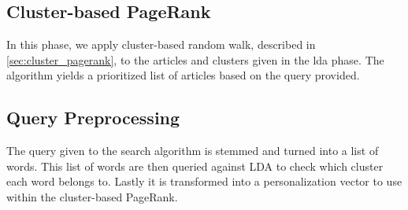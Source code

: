 \subsection{Cluster-based PageRank}
In this phase, we apply cluster-based random walk, described in \autoref{sec:cluster_pagerank}, to the articles and clusters given in the \gls{lda} phase.
The algorithm yields a prioritized list of articles based on the query provided.


\subsection{Query Preprocessing}
The query  given to the search algorithm is stemmed and turned into a list of words. 
This list of words are then queried against LDA to check which cluster each word belongs to.
Lastly it is transformed into a personalization vector to use within the cluster-based PageRank.
